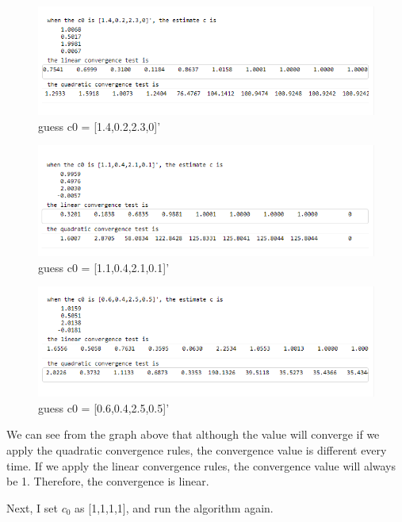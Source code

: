 \documentclass[a4paper]{article}
\begin{document}
\begin{figure}[H] 
\centering 
\includegraphics[width=1.0\textwidth]{2.2-3.png}
\caption{guess c0 = [1.4,0.2,2.3,0]'} 
\label{Fig.2.2-3} 
\end{figure}

\begin{figure}[H] 
\centering 
\includegraphics[width=1.0\textwidth]{2.2-4.png}
\caption{guess c0 = [1.1,0.4,2.1,0.1]'} 
\label{Fig.2.2-4} 
\end{figure}

\begin{figure}[H] 
\centering 
\includegraphics[width=1.0\textwidth]{2.2-5.png}
\caption{guess c0 = [0.6,0.4,2.5,0.5]'} 
\label{Fig.2.2-5} 
\end{figure}

We can see from the graph above that although the value will converge if we apply the quadratic convergence rules, the convergence value is different every time. If we apply the linear convergence rules, the convergence value will always be 1. Therefore, the convergence is linear.

Next, I set $c_{0}$ as [1,1,1,1], and run the algorithm again.
\end{document}

